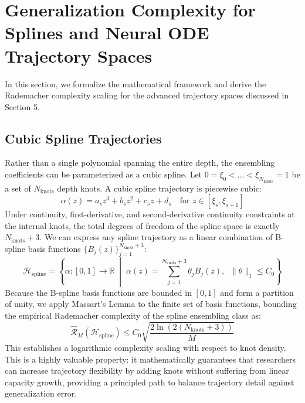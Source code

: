 \documentclass{article}
\theoremstyle{plain}
\theoremstyle{definition}
\theoremstyle{remark}
\begin{document}
\section{Generalization Complexity for Splines and Neural ODE Trajectory Spaces}
\label{sec:appendix_advanced_trajectories}

In this section, we formalize the mathematical framework and derive the Rademacher complexity scaling for the advanced trajectory spaces discussed in Section 5.

\subsection{Cubic Spline Trajectories}
Rather than a single polynomial spanning the entire depth, the ensembling coefficients can be parameterized as a cubic spline. Let $0 = \xi_0 < \dots < \xi_{N_{\text{knots}}} = 1$ be a set of $N_{\text{knots}}$ depth knots. A cubic spline trajectory is piecewise cubic:
\begin{equation}
\alpha(z) = a_s z^3 + b_s z^2 + c_s z + d_s \quad \text{for } z \in [\xi_s, \xi_{s+1}]
\end{equation}
Under continuity, first-derivative, and second-derivative continuity constraints at the internal knots, the total degrees of freedom of the spline space is exactly $N_{\text{knots}} + 3$. We can express any spline trajectory as a linear combination of B-spline basis functions $\{B_j(z)\}_{j=1}^{N_{\text{knots}} + 3}$:
\begin{equation}
\mathcal{H}_{\text{spline}} = \left\{ \alpha: [0, 1] \to \mathbb{R} \;\middle|\; \alpha(z) = \sum_{j=1}^{N_{\text{knots}}+3} \theta_j B_j(z), \;\; \|\theta\|_1 \le C_0 \right\}
\end{equation}
Because the B-spline basis functions are bounded in $[0, 1]$ and form a partition of unity, we apply Massart's Lemma to the finite set of basis functions, bounding the empirical Rademacher complexity of the spline ensembling class as:
\begin{equation}
\widehat{\mathcal{R}}_M(\mathcal{H}_{\text{spline}}) \le C_0 \sqrt{\frac{2 \ln(2(N_{\text{knots}} + 3))}{M}}
\end{equation}
This establishes a logarithmic complexity scaling with respect to knot density. This is a highly valuable property: it mathematically guarantees that researchers can increase trajectory flexibility by adding knots without suffering from linear capacity growth, providing a principled path to balance trajectory detail against generalization error.
\end{document}
